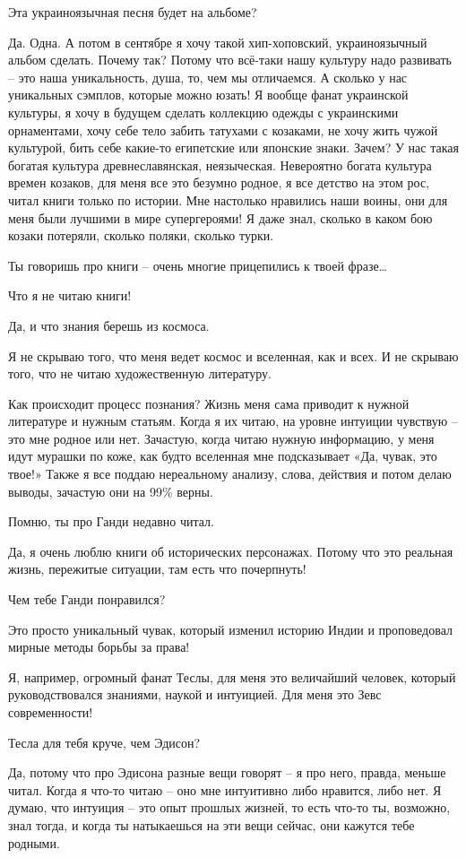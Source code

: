Эта украиноязычная песня будет на альбоме?

Да. Одна. А потом в сентябре я хочу такой хип-хоповский, украиноязычный альбом
сделать. Почему так? Потому что всё-таки нашу культуру надо развивать – это
наша уникальность, душа,  то, чем мы отличаемся. А сколько у нас уникальных
сэмплов, которые можно юзать! Я вообще фанат украинской культуры, я хочу в
будущем сделать коллекцию одежды с украинскими орнаментами, хочу себе тело
забить татухами с козаками, не хочу жить чужой культурой, бить себе какие-то
египетские или японские знаки. Зачем? У нас такая богатая культура
древнеславянская, неязыческая. Невероятно богата культура времен козаков, для
меня все это безумно родное, я все детство на этом рос, читал книги только по
истории. Мне настолько нравились наши воины, они для меня были лучшими в мире
супергероями! Я даже знал, сколько в каком бою козаки потеряли, сколько поляки,
сколько турки.

Ты говоришь про книги – очень многие прицепились к твоей фразе…

Что я не читаю книги!

Да, и что знания берешь из космоса.

Я не скрываю того, что меня ведет космос и вселенная, как и всех. И не скрываю
того, что не читаю художественную литературу.

Как происходит процесс познания? Жизнь меня сама приводит к нужной литературе и
нужным статьям. Когда я их читаю, на уровне интуиции чувствую – это мне родное
или нет. Зачастую, когда читаю нужную информацию, у меня идут мурашки по коже,
как будто вселенная мне подсказывает «Да, чувак, это твое!» Также я все поддаю
нереальному анализу, слова, действия и потом делаю выводы, зачастую они на 99\%
верны.

Помню, ты про Ганди недавно читал.

Да, я очень люблю книги об исторических персонажах. Потому что это реальная
жизнь, пережитые ситуации, там есть что почерпнуть!

Чем тебе Ганди понравился?

Это просто уникальный чувак, который изменил историю Индии и проповедовал
мирные методы борьбы за права!

Я, например, огромный фанат Теслы, для меня это величайший человек, который
руководствовался знаниями, наукой и интуицией. Для меня это Зевс современности!

Тесла для тебя круче, чем Эдисон?

Да, потому что про Эдисона разные вещи говорят – я про него, правда, меньше
читал. Когда я что-то читаю – оно мне интуитивно либо нравится, либо нет. Я
думаю, что интуиция – это опыт прошлых жизней, то есть что-то ты, возможно,
знал тогда, и когда ты натыкаешься на эти вещи сейчас, они кажутся тебе
родными.


